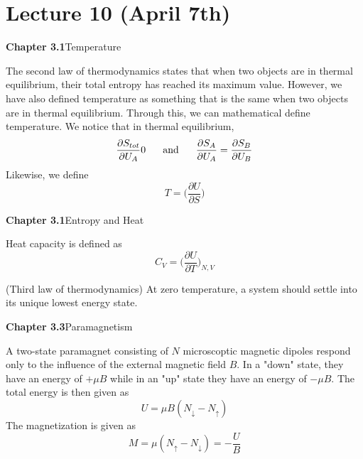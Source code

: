 \section{Lecture 10 (April 7th)}
{\bf Chapter 3.1}\hspace{2ex}Temperature
\begin{defi}
The second law of thermodynamics states that when two objects are in thermal equilibrium, their total entropy has reached its maximum value. However, we have also defined temperature as something that is the same when two objects are in thermal equilibrium. Through this, we can mathematical define temperature. We notice that in thermal equilibrium, 
\[\dfrac{\partial S_{tot}}{\partial U_{A}}0\hspace{4ex}\mathrm{and}\hspace{4ex}\dfrac{\partial S_{A}}{\partial U_{A}}=\dfrac{\partial S_{B}}{\partial U_{B}}\]
Likewise, we define 
\[T=\Big(\dfrac{\partial U}{\partial S} \Big)\]
\end{defi}
\vspace{2ex}
{\bf Chapter 3.1}\hspace{2ex}Entropy and Heat
\\
\begin{defi}
Heat capacity is defined as 
\[C_{V}=\Big(\dfrac{\partial U}{\partial T} \Big)_{N,V}\]
\end{defi}
\vspace{2ex}
\begin{thm}
(Third law of thermodynamics) At zero temperature, a system should settle into its unique lowest energy state.
\end{thm}
\vspace{2ex}
{\bf Chapter 3.3}\hspace{2ex}Paramagnetism
\\
\begin{defi}
A two-state paramagnet consisting of $N$ microscoptic magnetic dipoles respond only to the influence of the external magnetic field $B$. In a "down" state, they have an energy of $+\mu B$ while in an "up" state they have an energy of $-\mu B$. The total energy is then given as
\[U=\mu B(N_{\downarrow}-N_{\uparrow})\]
The magnetization is given as
\[M=\mu (N_{\uparrow}-N_{\downarrow})=-\dfrac{U}{B}\]
\end{defi}
\vspace{2ex}

